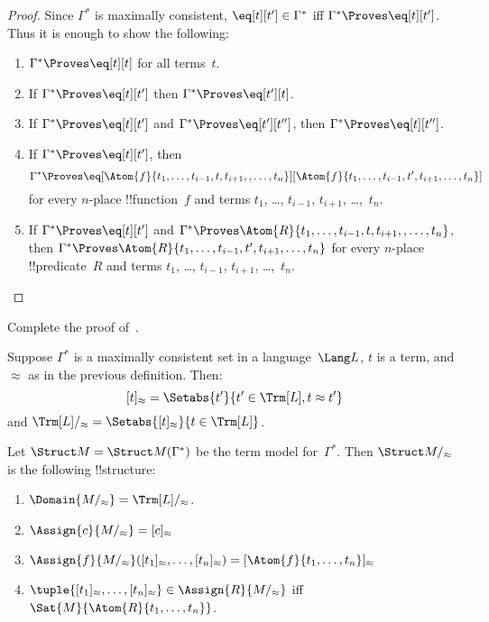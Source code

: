 \documentclass[../../include/open-logic-section]{subfiles}
\begin{document}
\begin{proof}
Since $\Gamma^*$ is maximally consistent, $\eq[t][t'] \in \Gamma^*$
iff $\Gamma^* \Proves \eq[t][t']$. Thus it is enough to show the
following:
\begin{enumerate}
\item $\Gamma^* \Proves \eq[t][t]$ for all terms~$t$.
\item If $\Gamma^* \Proves \eq[t][t']$ then $\Gamma^* \Proves \eq[t'][t]$.
\item If $\Gamma^* \Proves \eq[t][t']$ and $\Gamma^* \Proves
  \eq[t'][t'']$, then $\Gamma^* \Proves \eq[t][t'']$.
\item If $\Gamma^* \Proves \eq[t][t']$, then 
\[
\Gamma^* \Proves
\eq[\Atom{f}{t_1,\dots,t_{i-1},t,t_{i+1},,\dots,t_n}][\Atom{f}{t_1,\dots,t_{i-1},t',t_{i+1},\dots,t_n}]
\]
for every $n$-place !!{function}~$f$ and terms $t_1$, \dots,
$t_{i-1}$, $t_{i+1}$, \dots,~$t_n$.
\item If $\Gamma^* \Proves \eq[t][t']$ and
$\Gamma^* \Proves
\Atom{R}{t_1,\dots,t_{i-1},t,t_{i+1},,\dots,t_n}$, then
$\Gamma^* \Proves \Atom{R}{t_1,\dots,t_{i-1},t',t_{i+1},\dots,t_n}$
for every $n$-place !!{predicate}~$R$ and terms $t_1$, \dots,
$t_{i-1}$, $t_{i+1}$, \dots,~$t_n$.
\end{enumerate}
\end{proof}

\begin{prob}
Complete the proof of~.
\end{prob}

\begin{defn}
Suppose $\Gamma^*$ is a maximally consistent set in a language~$\Lang
L$, $t$ is a term, and $\approx$ as in the previous definition. Then:
\[
[t]_\approx = \Setabs{t'}{t'\in \Trm[L], t \approx t'}
\]
and $\Trm[L]/_\approx = \Setabs{[t]_\approx}{t \in \Trm[L]}$.
\end{defn}

\begin{defn}
Let $\Struct M = \Struct M(\Gamma^*)$ be the term model for~$\Gamma^*$. Then
$\Struct M/_\approx$ is the following !!{structure}:
\begin{enumerate}
\item $\Domain{M/_\approx} = \Trm[L]/_\approx$.
\item $\Assign{c}{M/_\approx} = [c]_\approx$
\item $\Assign{f}{M/_\approx}([t_1]_\approx, \dots,
  [t_n]_\approx) = [\Atom{f}{t_1,\dots, t_n}]_\approx$
\item $\tuple{[t_1]_\approx, \dots, [t_n]_\approx} \in
  \Assign{R}{M/_\approx}$ iff $\Sat{M}{\Atom{R}{t_1,\dots, t_n}}$.
\end{enumerate}
\end{defn}
\end{document}
